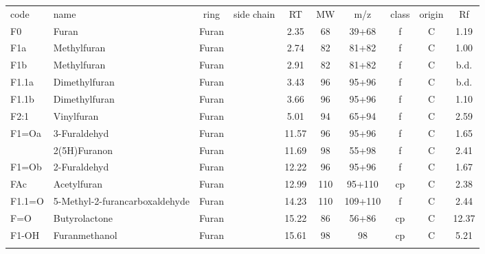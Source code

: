 \documentclass[preprint,review,12pt]{elsarticle}
\begin{document}
{\begin{table*}[p!]
\begin{center}
{\tiny
\begin{tabular}{llclcccccc}
code & name & ring & side chain & RT & MW & m/z & class & origin&Rf\\
F0&		Furan&				Furan&			&		2.35&		68&	39+68&		f&	C&	1.19\\
F1a&		Methylfuran&			Furan&			&		2.74&		82&	81+82&		f&	C&	1.00\\
F1b&		Methylfuran&			Furan&			&		2.91&		82&	81+82&		f&	C&	b.d.\\
F1.1a&		Dimethylfuran&			Furan&			&		3.43&		96&	95+96&		f&	C&	b.d.\\
F1.1b&		Dimethylfuran&			Furan&			&		3.66&		96&	95+96&		f&	C&	1.10\\
F2:1&		Vinylfuran&			Furan&			&		5.01&		94&	65+94&		f&	C&	2.59\\
F1=Oa&		3-Furaldehyd&			Furan&			&		11.57&		96&	95+96&		f&	C&	1.65\\
&		2(5H)Furanon&			Furan&			&		11.69&		98&	55+98&		f&	C&	2.41\\
F1=Ob&		2-Furaldehyd&			Furan&			&		12.22&		96&	95+96&		f&	C&	1.67\\
FAc&		Acetylfuran&			Furan&			&		12.99&		110&	95+110&		cp&	C&	2.38\\
F1.1=O&		5-Methyl-2-furancarboxaldehyde&	Furan&			&		14.23&		110&	109+110&	f&	C&	2.44\\
F=O&		Butyrolactone&			Furan&			&		15.22&		86&	56+86&		cp&	C&	12.37\\
F1-OH&		Furanmethanol&			Furan&			&		15.61&		98&	98&		cp&	C&	5.21\\
\\


\end{tabular}}
\end{center}
\end{table*}}
\end{document}
